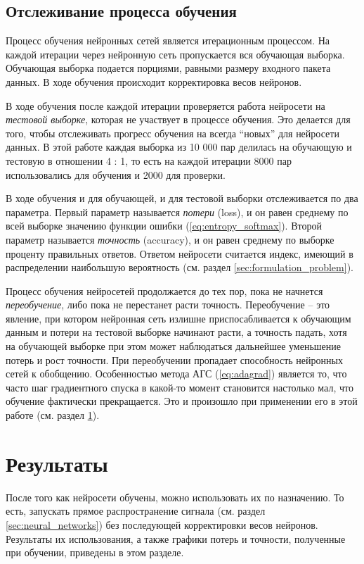 \documentclass[a4paper,12pt]{article}
\theoremstyle{remark}
\begin{document}
 	\subsection{Отслеживание процесса обучения}
	Процесс обучения нейронных сетей является итерационным процессом. На каждой итерации через нейронную сеть пропускается вся обучающая выборка. Обучающая выборка подается порциями, равными размеру входного пакета данных. В ходе обучения происходит корректировка весов нейронов.
	
	В ходе обучения после каждой итерации проверяется работа нейросети на \textit{тестовой выборке}, которая не участвует в процессе обучения. Это делается для того, чтобы отслеживать прогресс обучения на всегда ``новых'' для нейросети данных. В этой работе каждая выборка из 10 000 пар делилась на обучающую и тестовую в отношении 4 : 1, то есть на каждой итерации 8000 пар использовались для обучения и 2000 для проверки.
	
	В ходе обучения и для обучающей, и для тестовой выборки отслеживается по два параметра. Первый параметр называется \textit{потери} (loss), и он равен среднему по всей выборке значению функции ошибки (\ref{eq:entropy_softmax}). Второй параметр называется \textit{точность} (accuracy), и он равен среднему по выборке проценту правильных ответов. Ответом нейросети считается индекс, имеющий в распределении наибольшую вероятность (см. раздел \ref{sec:formulation_problem}).
	
	Процесс обучения нейросетей продолжается до тех пор, пока не начнется \textit{переобучение}, либо пока не перестанет расти точность. Переобучение -- это явление, при котором нейронная сеть излишне приспосабливается к обучающим данным и потери на тестовой выборке начинают расти, а точность падать, хотя на обучающей выборке при этом может наблюдаться дальнейшее уменьшение потерь и рост точности. При переобучении пропадает способность нейронных сетей к обобщению. Особенностью метода АГС (\ref{eq:adagrad}) является то, что часто шаг градиентного спуска в какой-то момент становится настолько мал, что обучение фактически прекращается. Это и произошло при применении его в этой работе (см. раздел \ref{sec:results}).
	
	\newpage
	\section{Результаты}
	\label{sec:results}
	
	После того как нейросети обучены, можно использовать их по назначению. То есть, запускать прямое распространение сигнала (см. раздел \ref{sec:neural_networks}) без последующей корректировки весов нейронов. Результаты их использования, а также графики потерь и точности, полученные при обучении, приведены в этом разделе.
	
\end{document}
